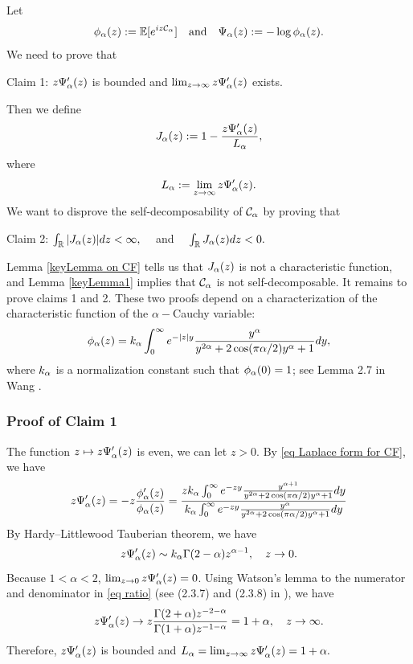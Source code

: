 \documentclass[12pt]{amsart}
\begin{document}
Let 
$$\phi_\alpha(z) := \mathbb{E}[e^{iz \mathcal{C}_\alpha }] \quad \text{and} \quad  \Psi_\alpha(z) := -\log \phi_\alpha (z). $$
We need to prove that 
\begin{center}
    Claim 1: $z\Psi_\alpha'(z)$ is bounded and $\lim_{z \rightarrow  \infty} z\Psi_\alpha'(z)$ exists. 
\end{center}
Then we define 
\begin{equation}
    \label{eq def J_alpha}
    J_\alpha(z) := 1 - \frac{z \Psi_\alpha'(z)}{L_\alpha},
\end{equation}
where 
$$ L_\alpha :=  \lim_{z \rightarrow  \infty} z\Psi_\alpha'(z).$$
We want to disprove the self-decomposability of $\mathcal{C}_\alpha$ by proving that 
\begin{center}
    Claim 2: $\int_\mathbb{R}|J_\alpha(z)|dz < \infty,  \quad$ and $\quad  \int_\mathbb{R} J_\alpha (z)dz < 0.$
\end{center}
Lemma \ref{keyLemma on CF} tells us that $ J_\alpha(z) $ is not a characteristic function, and Lemma \ref{keyLemma1} implies that 
$\mathcal{C}_\alpha$ is not self-decomposable. It remains to prove claims 1 and 2. These two proofs depend on a characterization of the characteristic function of the $\alpha-$Cauchy variable: 
\begin{equation}
    \label{eq Laplace form for CF}
    \phi_\alpha(z) = k_\alpha  \int_0^\infty  e^{-|z|y}  \frac{ y^\alpha}{  y^{2\alpha} + 2\cos(\pi \alpha/2)y^\alpha + 1}dy, 
\end{equation}
where $k_\alpha$ is a normalization constant such that $ \phi_\alpha(0) = 1$; see Lemma 2.7 in Wang \cite{Wan26+}. 

\subsubsection{Proof of Claim 1} The function $z \mapsto z \Psi_\alpha'(z)$ is even, we can let $z > 0$. 
By \eqref{eq Laplace form for CF}, we have 
\begin{equation}
\label{eq ratio}
    z \Psi_\alpha'(z) = - z \frac{\phi'_\alpha(z)}{\phi_\alpha(z)} = \frac{ z k_\alpha \int_0^\infty  e^{-zy}  \frac{ y^{\alpha+1}}{  y^{2\alpha} + 2\cos(\pi \alpha/2)y^\alpha + 1}dy}{ k_\alpha \int_0^\infty  e^{-zy}  \frac{ y^\alpha}{  y^{2\alpha} + 2\cos(\pi \alpha/2)y^\alpha + 1}dy}
\end{equation}
By Hardy–Littlewood Tauberian theorem, we have
\begin{equation}
\label{eq sym at 0}
    z \Psi_\alpha'(z) \sim   k_\alpha \Gamma(2-\alpha) z^{\alpha -1} ,  \quad z \rightarrow 0. 
\end{equation}
Because $1< \alpha < 2$, $\lim_{z \rightarrow  0} z\Psi_\alpha'(z) = 0$. Using Watson's lemma to the numerator and denominator in \eqref{eq ratio} (see (2.3.7) and (2.3.8) in \cite{NIST}), we have 
\begin{equation}
    z \Psi_\alpha'(z) \rightarrow   z \frac{\Gamma(2+\alpha)z^{-2-\alpha}}{\Gamma(1+\alpha)z^{-1-\alpha}}  = 1 + \alpha,  \quad z \rightarrow \infty. 
\end{equation}
Therefore,  $z\Psi_\alpha'(z)$ is bounded and 
$ L_\alpha =  \lim_{z \rightarrow  \infty} z\Psi_\alpha'(z) = 1+\alpha.$
\end{document}
